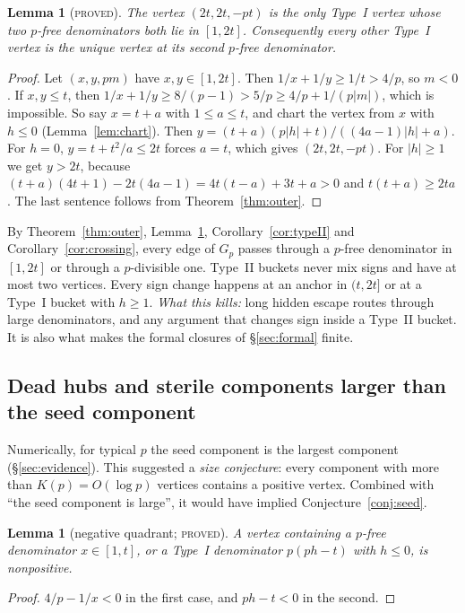\documentclass[11pt,reqno]{amsart}
\newtheorem{lemma}[theorem]{Lemma}
\theoremstyle{definition}
\newcommand{\status}[1]{\textsc{#1}}
\begin{document}
\begin{lemma}[\status{proved}]\label{lem:leaf}
The vertex $(2t,2t,-pt)$ is the only Type~I vertex whose two $p$-free
denominators both lie in $[1,2t]$.  Consequently every other Type~I vertex
is the unique vertex at its second $p$-free denominator.
\end{lemma}

\begin{proof}
Let $(x,y,pm)$ have $x,y\in[1,2t]$.  Then $1/x+1/y\ge1/t>4/p$, so $m<0$.  If
$x,y\le t$, then $1/x+1/y\ge8/(p-1)>5/p\ge4/p+1/(p|m|)$, which is
impossible.  So say $x=t+a$ with $1\le a\le t$, and chart the vertex from
$x$ with $h\le0$ (Lemma~\ref{lem:chart}).  Then
$y=(t+a)(p|h|+t)/((4a-1)|h|+a)$.  For $h=0$, $y=t+t^2/a\le2t$ forces $a=t$,
which gives $(2t,2t,-pt)$.  For $|h|\ge1$ we get $y>2t$, because
$(t+a)(4t+1)-2t(4a-1)=4t(t-a)+3t+a>0$ and $t(t+a)\ge2ta$.  The last
sentence follows from Theorem~\ref{thm:outer}.
\end{proof}

By Theorem~\ref{thm:outer}, Lemma~\ref{lem:leaf}, Corollary~\ref{cor:typeII} and
Corollary~\ref{cor:crossing}, every edge of $G_p$ passes through a $p$-free
denominator in $[1,2t]$ or through a $p$-divisible one.  Type~II buckets
never mix signs and have at most two vertices.  Every sign change happens at
an anchor in $(t,2t]$ or at a Type~I bucket with $h\ge1$.
\emph{What this kills:} long hidden escape routes through large
denominators, and any argument that changes sign inside a Type~II bucket.
It is also what makes the formal closures of \S\ref{sec:formal} finite.

\subsection{Dead hubs and sterile components larger than the seed component}
Numerically, for typical $p$ the seed component is the largest component
(\S\ref{sec:evidence}).  This suggested a \emph{size conjecture}: every
component with more than $K(p)=O(\log p)$ vertices contains a positive
vertex.  Combined with ``the seed component is large'', it would have
implied Conjecture~\ref{conj:seed}.

\begin{lemma}[negative quadrant; \status{proved}]\label{lem:A}
A vertex containing a $p$-free denominator $x\in[1,t]$, or a Type~I
denominator $p(ph-t)$ with $h\le0$, is nonpositive.
\end{lemma}

\begin{proof}
$4/p-1/x<0$ in the first case, and $ph-t<0$ in the second.
\end{proof}
\end{document}
